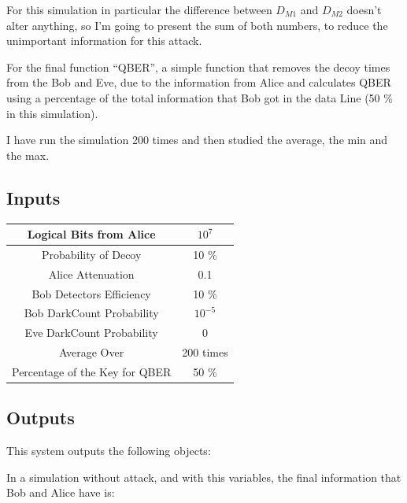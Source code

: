 \begin{refsection}
For this simulation in particular the difference between $D_{M1}$ and $D_{M2}$ doesn't alter anything, so I'm going to present the sum of both numbers, to reduce the unimportant information for this attack.

For the final function ``QBER'', a simple function that removes the decoy times from the Bob and Eve, due to the information from Alice and calculates QBER using a percentage of the total information that Bob got in the data Line (50 \% in this simulation).

I have run the simulation 200 times and then studied the average, the min and the max.

\subsection*{Inputs}

\begin{table}[hbt!]
\centering
\Large
\begin{tabular}{|c|c|}
\hline
\cellcolor[HTML]{005288}\color{white} Logical Bits from Alice & $10^{7}$\\ \hline
\cellcolor[HTML]{005288}\color{white} Probability of Decoy & 10 \% \\ \hline
\cellcolor[HTML]{005288}\color{white} Alice Attenuation & 0.1\\ \hline
\cellcolor[HTML]{005288}\color{white} Bob Detectors Efficiency  & 10 \% \\ \hline
\cellcolor[HTML]{005288}\color{white} Bob DarkCount Probability & $10^{-5}$ \\ \hline
\cellcolor[HTML]{005288}\color{white} Eve DarkCount Probability & $0$ \\ \hline
\cellcolor[HTML]{005288}\color{white} Average Over & 200 times\\ \hline
\cellcolor[HTML]{005288}\color{white} Percentage of the Key for QBER & 50 \% \\ \hline
\end{tabular}
\end{table}

\subsection*{Outputs}

This system outputs the following objects:

In a simulation without attack, and with this variables, the final information that Bob and Alice have is:


\end{refsection}
